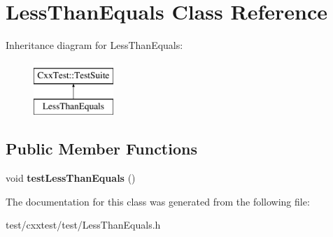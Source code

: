 \hypertarget{classLessThanEquals}{\section{Less\-Than\-Equals Class Reference}
\label{classLessThanEquals}
}
Inheritance diagram for Less\-Than\-Equals\-:\begin{figure}[H]
\begin{center}
\leavevmode
\includegraphics[height=2.000000cm]{classLessThanEquals}
\end{center}
\end{figure}
\subsection*{Public Member Functions}
\begin{DoxyCompactItemize}
\item 
\hypertarget{classLessThanEquals_a164edf63ad6f0d6f57a4d8d78866b361}{void {\bfseries test\-Less\-Than\-Equals} ()}\label{classLessThanEquals_a164edf63ad6f0d6f57a4d8d78866b361}

\end{DoxyCompactItemize}


The documentation for this class was generated from the following file\-:\begin{DoxyCompactItemize}
\item 
test/cxxtest/test/Less\-Than\-Equals.\-h\end{DoxyCompactItemize}
